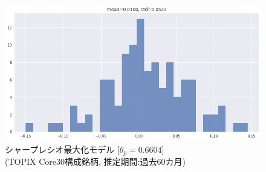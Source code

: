 \documentclass[dvipdfmx,autodetect-engine]{jsarticle}
\begin{document}
\begin{figure}[htbp]
\begin{minipage}{0.5\hsize}
\begin{center}
\includegraphics[width=1.0\hsize]{./figures/srmp_tpx30_w=60_hist.png}
\end{center}
\caption{シャープレシオ最大化モデル [$\theta_p=0.6604$]\\(TOPIX Core30構成銘柄, 推定期間:過去60カ月)}
\label{fig:32}
\end{minipage}
\end{figure}
\end{document}
